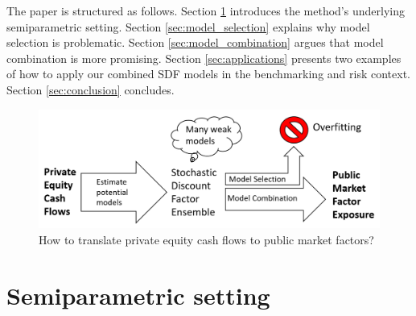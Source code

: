 \documentclass[12pt]{article}
\begin{document}
The paper is structured as follows.
Section \ref{sec:semiparametric_setting} introduces the method's underlying semiparametric setting.
Section \ref{sec:model_selection} explains why model selection is problematic.
Section \ref{sec:model_combination} argues that model combination is more promising.
Section \ref{sec:applications} presents two examples of how to apply our combined SDF models in the benchmarking and risk context.
Section \ref{sec:conclusion} concludes.

\begin{figure}[ht]
	\centering
	\includegraphics[width=14cm]{FlowChart/FC4}
	\caption{How to translate private equity cash flows to public market factors?}
	\label{fig:how}
\end{figure}

\section{Semiparametric setting}
\label{sec:semiparametric_setting}
\end{document}
